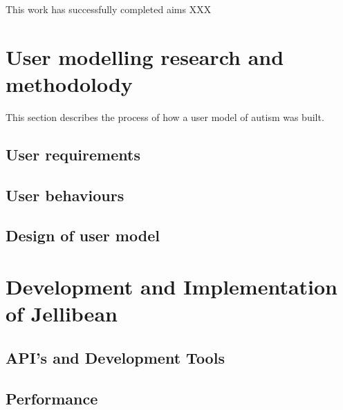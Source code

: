 \documentclass[a4paper, 11pt]{article}
\begin{document}
This work has successfully completed aims XXX

\section{User modelling research and methodolody}
This section describes the process of how a user model of autism was built. 
\subsection{User requirements}
\subsection{User behaviours}
\subsection{Design of user model}

\section{Development and Implementation of Jellibean}
\subsection{API's and Development Tools}
\subsection{Performance}
\end{document}
